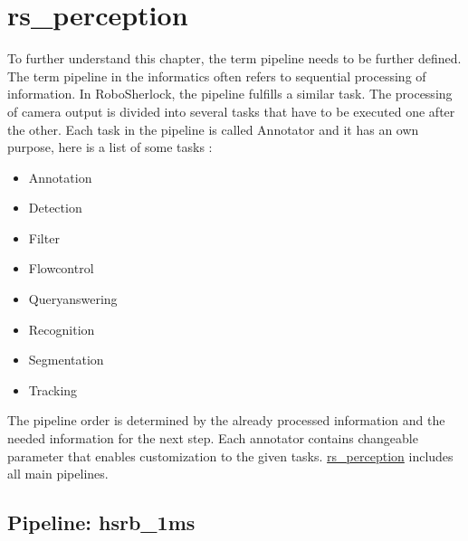 \documentclass[main.tex]{subfiles}
\begin{document}
		\section{rs\_perception}
To further understand this chapter, the term pipeline needs to be further defined. The term pipeline in the informatics often refers to sequential processing of information.
In RoboSherlock, the pipeline fulfills a similar task. The processing of camera output is divided into several tasks that have to be executed one after the other.
Each task in the pipeline is called Annotator and it has an own purpose, here is a list of some tasks : 
		\begin{itemize}
			\item Annotation
			\item Detection
			\item Filter
			\item Flowcontrol
			\item Queryanswering
			\item Recognition 
			\item Segmentation
			\item Tracking
		\end{itemize}		
The pipeline order is determined by the already processed information and the needed information for the next step.
Each annotator contains changeable parameter that enables customization to the given tasks.
\href{https://github.com/SUTURO/suturo_perception/tree/master/rs_perception}{rs\_perception} includes all main pipelines. 

			\subsection{Pipeline: hsrb\_1ms}
\end{document}
